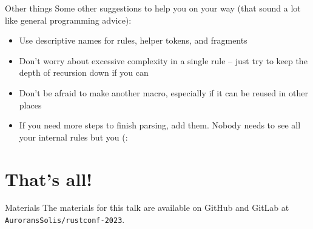 \documentclass{beamer}
\begin{document}
	\begin{frame}{Other things}
		Some other suggestions to help you on your way (that sound a lot like general programming
		advice):
		\begin{itemize}
			\item Use descriptive names for rules, helper tokens, and fragments
			\item Don't worry about excessive complexity in a single rule -- just try to keep the
				depth of recursion down if you can
			\item Don't be afraid to make another macro, especially if it can be reused in other
				places
			\item If you need more steps to finish parsing, add them. Nobody needs to see all your
				internal rules but you (:
		\end{itemize}
	\end{frame}

	\section{That's all!}
	\begin{frame}{Materials}
		The materials for this talk are available on GitHub and GitLab at
		\texttt{AuroransSolis/rustconf-2023}.
	\end{frame}
\end{document}
